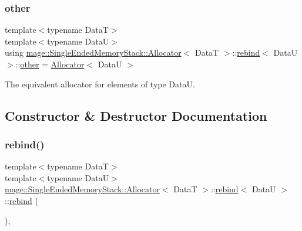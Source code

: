 \subsubsection{\texorpdfstring{other}{other}}
{\footnotesize\ttfamily template$<$typename DataT$>$ \\
template$<$typename DataU$>$ \\
using \hyperlink{structmage_1_1_single_ended_memory_stack_1_1_allocator}{mage\+::\+Single\+Ended\+Memory\+Stack\+::\+Allocator}$<$ DataT $>$\+::\hyperlink{structmage_1_1_single_ended_memory_stack_1_1_allocator_1_1rebind}{rebind}$<$ DataU $>$\+::\hyperlink{structmage_1_1_single_ended_memory_stack_1_1_allocator_1_1rebind_a8046a39ba6854ffa75978d58b0aafa02}{other} =  \hyperlink{structmage_1_1_single_ended_memory_stack_1_1_allocator}{Allocator}$<$ DataU $>$}

The equivalent allocator for elements of type {\ttfamily DataU}. 

\subsection{Constructor \& Destructor Documentation}
\hypertarget{structmage_1_1_single_ended_memory_stack_1_1_allocator_1_1rebind_a4ba91415d43d61d53cd997be987edcbc}{}\label{structmage_1_1_single_ended_memory_stack_1_1_allocator_1_1rebind_a4ba91415d43d61d53cd997be987edcbc} 
\subsubsection{\texorpdfstring{rebind()}{rebind()}\hspace{0.1cm}{\footnotesize\ttfamily [1/3]}}
{\footnotesize\ttfamily template$<$typename DataT$>$ \\
template$<$typename DataU$>$ \\
\hyperlink{structmage_1_1_single_ended_memory_stack_1_1_allocator}{mage\+::\+Single\+Ended\+Memory\+Stack\+::\+Allocator}$<$ DataT $>$\+::\hyperlink{structmage_1_1_single_ended_memory_stack_1_1_allocator_1_1rebind}{rebind}$<$ DataU $>$\+::\hyperlink{structmage_1_1_single_ended_memory_stack_1_1_allocator_1_1rebind}{rebind} (\begin{DoxyParamCaption}{ }\end{DoxyParamCaption})\hspace{0.3cm}{\ttfamily [private]}, {\ttfamily [delete]}}

